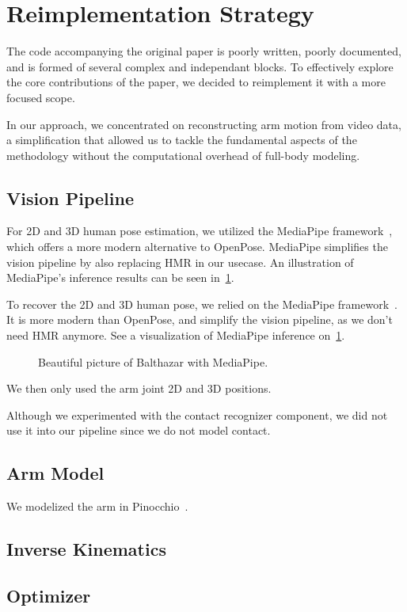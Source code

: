 \section{Reimplementation Strategy}
\label{sec:remplementation}

The code accompanying the original paper  is poorly written, poorly documented, and is formed of several complex and independant blocks. 
To effectively explore the core contributions of the paper, we decided to reimplement it with a more focused scope.

In our approach, we concentrated on reconstructing arm motion from video data, a simplification that allowed us to tackle the fundamental 
aspects of the methodology without the computational overhead of full-body modeling.

\subsection{Vision Pipeline}
\label{subsec:vision_pipeline}

For 2D and 3D human pose estimation, we utilized the MediaPipe framework~\cite{lugaresi2019mediapipe}, which offers a more modern alternative 
to OpenPose. MediaPipe simplifies the vision pipeline by also replacing HMR in our usecase. An illustration of MediaPipe's inference results 
can be seen in~\cref{fig:mediapipe}.

To recover the 2D and 3D human pose, we relied on the MediaPipe framework~\cite{lugaresi2019mediapipe}. It is more modern than OpenPose, and 
simplify the vision pipeline, as we don't need HMR anymore. See a visualization of MediaPipe inference on~\cref{fig:mediapipe}.

\begin{figure}
    \centering
    \fbox{\rule{0pt}{2in} \rule{0.9\linewidth}{0pt}}
    \caption{Beautiful picture of Balthazar with MediaPipe.}
    \label{fig:mediapipe}
\end{figure}

We then only used the arm joint 2D and 3D positions.

Although we experimented with the contact recognizer component, we did not use it into our pipeline since we do not model contact.

\subsection{Arm Model}

We modelized the arm in Pinocchio~\cite{carpentier2019pinocchio}.

\subsection{Inverse Kinematics}

\subsection{Optimizer}

